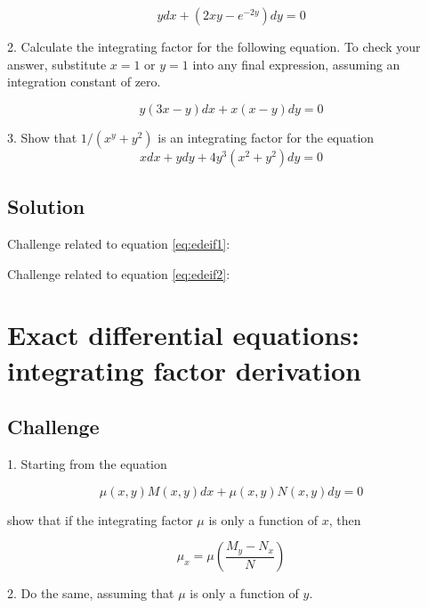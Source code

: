 \begin{equation}
    \label{eq:edeif1}
    y dx + (2 x y - e^{-2 y}) dy = 0
\end{equation}

2. Calculate the integrating factor for the following equation. To check your answer, substitute $x=1$ or $y=1$ into any final expression, assuming an integration constant of zero.

\begin{equation}
    \label{eq:edeif2}
    y(3x-y) dx + x(x-y)dy = 0
\end{equation}

3. Show that $1/(x^y+y^2)$ is an integrating factor for the equation
\begin{equation}
    x dx + y dy + 4 y^3 (x^2 + y^2)dy = 0
\end{equation}

\subsection*{Solution}
Challenge related to equation \ref{eq:edeif1}: 

Challenge related to equation \ref{eq:edeif2}: 




\newpage
\section{Exact differential equations: integrating factor derivation}
\label{sec:intfacderiv}

\subsection*{Challenge}
1. Starting from the equation

\begin{equation}
    \mu(x,y) M(x,y) dx + \mu(x,y) N(x,y) dy = 0
\end{equation}

show that if the integrating factor $\mu$ is only a function of $x$, then

\begin{equation}
    \label{eq:intfacmux}
    \mu_x = \mu \left ( \frac{M_y-N_x}{N} \right )
\end{equation}

2. Do the same, assuming that $\mu$ is only a function of $y$.


